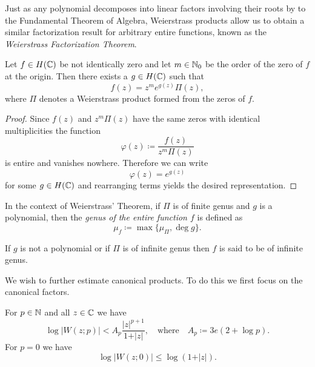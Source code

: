 Just as any polynomial decomposes into linear factors involving their roots by to the Fundamental Theorem of Algebra, Weierstrass products allow us to obtain a similar factorization result for arbitrary entire functions, known as the \emph{Weierstrass Factorization Theorem}.

\begin{theorem}[Weierstrass] \label{thm:weierstrass}
    Let $f \in H(\mathbb{C})$ be not identically zero and let $m \in \mathbb{N}_0$ be the order of the zero of $f$ at the origin. Then there exists a $g \in H(\mathbb{C})$ such that
    \begin{equation}
        f(z) = z^m e^{g(z)} \Pi(z),
    \end{equation}
    where $\Pi$ denotes a Weierstrass product formed from the zeros of $f$.
\end{theorem}

\begin{proof}
    Since $f(z)$ and $z^m \Pi(z)$ have the same zeros with identical multiplicities the function
    $$ \varphi(z) \coloneqq \frac{f(z)}{z^m \Pi(z)} $$
    is entire and vanishes nowhere. Therefore we can write
    $$ \varphi(z) = e^{g(z)} $$
    for some $g \in H(\mathbb{C})$ and rearranging terms yields the desired representation.
\end{proof}

\begin{definition} \label{def:genus}
    In the context of Weierstrass' Theorem, if $\Pi$ is of finite genus and $g$ is a polynomial, then the \emph{genus of the entire function $f$} is defined as
    \begin{equation}
        \mu_f \coloneqq \max \{ \mu_\Pi, \deg g \}.
    \end{equation}

    If $g$ is not a polynomial or if $\Pi$ is of infinite genus then $f$ is said to be of infinite genus.
\end{definition}

We wish to further estimate canonical products. To do this we first focus on the canonical factors.

\begin{lemma} \label{lem:elementary-factor-estimate}
    For $p \in \mathbb{N}$ and all $z \in \mathbb{C}$ we have
    \begin{equation}
        \log \vert W(z; p) \vert < A_p \frac{\vert z \vert^{p+1}}{1 + \vert z \vert}, \quad \textrm{where} \quad A_p \coloneqq 3e (2 + \log p).
    \end{equation}
    For $p = 0$ we have
    \begin{equation}
        \log \vert W(z; 0) \vert \leq \log (1 + \vert z \vert).
    \end{equation}
\end{lemma}

